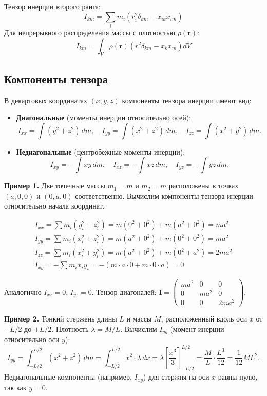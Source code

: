 \documentclass[12pt, a4paper]{article}
\begin{document}
Тензор инерции второго ранга:
\[
I_{km} = \sum_i m_i \left( r_i^2 \delta_{km} - x_{ik} x_{im} \right)
\]
Для непрерывного распределения массы с плотностью $\rho(\mathbf{r})$:
\[
I_{km} = \int_V \rho(\mathbf{r}) \left( r^2 \delta_{km} - x_k x_m \right) dV
\]

\subsection{Компоненты тензора}
В декартовых координатах \((x, y, z)\) компоненты тензора инерции имеют вид:
\begin{itemize}
\item \textbf{Диагональные} (моменты инерции относительно осей):
  \[
  I_{xx} = \int (y^2 + z^2)\,dm,\quad
  I_{yy} = \int (x^2 + z^2)\,dm,\quad
  I_{zz} = \int (x^2 + y^2)\,dm.
  \]
\item \textbf{Недиагональные} (центробежные моменты инерции):
  \[
  I_{xy} = -\int xy\,dm,\quad
  I_{xz} = -\int xz\,dm,\quad
  I_{yz} = -\int yz\,dm.
  \]
\end{itemize}

\textbf{Пример 1.} Две точечные массы \(m_1 = m\) и \(m_2 = m\) расположены в точках \((a,0,0)\) и \((0,a,0)\) соответственно. Вычислим компоненты тензора инерции относительно начала координат.

$$
\begin{array}{ll}
I_{xx} = \sum m_i (y_i^2 + z_i^2) = m(0^2+0^2) + m(a^2+0^2) = m a^2 \\
I_{yy} = \sum m_i (x_i^2 + z_i^2) = m(a^2+0^2) + m(0^2+0^2) = m a^2 \\
I_{zz} = \sum m_i (x_i^2 + y_i^2) = m(a^2+0^2) + m(0^2 + a^2) = 2 m a^2 \\
I_{xy} = -\sum m_i x_i y_i = -(m \cdot a \cdot 0 + m \cdot 0 \cdot a) = 0
\end{array}
$$


Аналогично \(I_{xz}=0\), \(I_{yz}=0\).
Тензор диагоналей: \(\mathbf{I} = \begin{pmatrix} m a^2 & 0 & 0 \\ 0 & m a^2 & 0 \\ 0 & 0 & 2 m a^2 \end{pmatrix}\).

\textbf{Пример 2.} Тонкий стержень длины \(L\) и массы \(M\), расположенный вдоль оси \(x\) от \(-L/2\) до \(+L/2\). Плотность \(\lambda = M/L\). Вычислим \(I_{yy}\) (момент инерции относительно оси \(y\)):
\[
I_{yy} = \int_{-L/2}^{L/2} (x^2 + z^2)\, dm = \int_{-L/2}^{L/2} x^2 \cdot \lambda\, dx = \lambda \left[ \frac{x^3}{3} \right]_{-L/2}^{L/2} = \frac{M}{L} \cdot \frac{L^3}{12} = \frac{1}{12} M L^2.
\]
Недиагональные компоненты (например, \(I_{xy}\)) для стержня на оси \(x\) равны нулю, так как \(y=0\).
\end{document}
